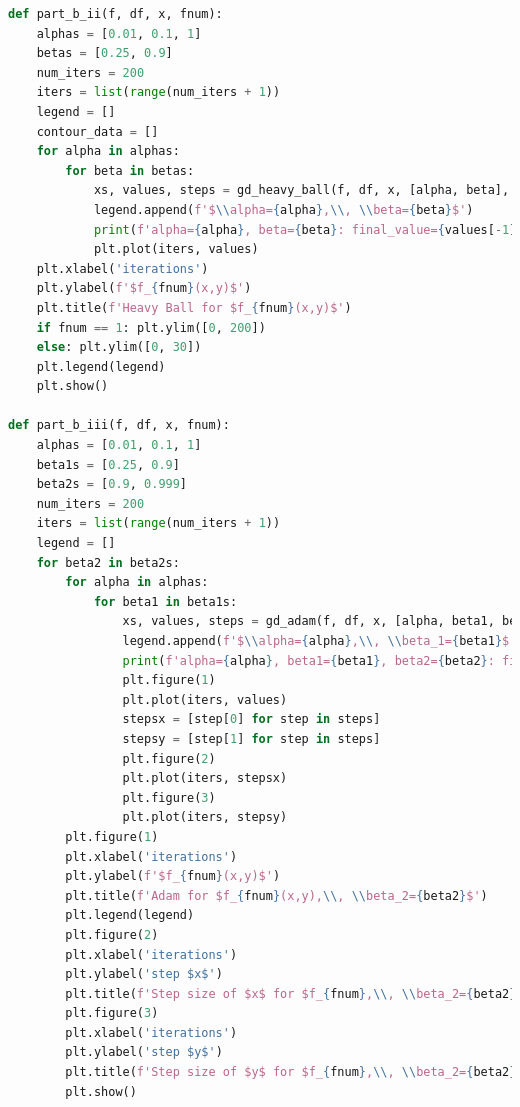 \documentclass[12pt]{article}
\begin{document}
\begin{lstlisting}[language=Python]
def part_b_ii(f, df, x, fnum):
    alphas = [0.01, 0.1, 1]
    betas = [0.25, 0.9]
    num_iters = 200
    iters = list(range(num_iters + 1))
    legend = []
    contour_data = []
    for alpha in alphas:
        for beta in betas:
            xs, values, steps = gd_heavy_ball(f, df, x, [alpha, beta], num_iters=num_iters)
            legend.append(f'$\\alpha={alpha},\\, \\beta={beta}$')
            print(f'alpha={alpha}, beta={beta}: final_value={values[-1]}')
            plt.plot(iters, values)
    plt.xlabel('iterations')
    plt.ylabel(f'$f_{fnum}(x,y)$')
    plt.title(f'Heavy Ball for $f_{fnum}(x,y)$')
    if fnum == 1: plt.ylim([0, 200])
    else: plt.ylim([0, 30])
    plt.legend(legend)
    plt.show()

def part_b_iii(f, df, x, fnum):
    alphas = [0.01, 0.1, 1]
    beta1s = [0.25, 0.9]
    beta2s = [0.9, 0.999]
    num_iters = 200
    iters = list(range(num_iters + 1))
    legend = []
    for beta2 in beta2s:
        for alpha in alphas:
            for beta1 in beta1s:
                xs, values, steps = gd_adam(f, df, x, [alpha, beta1, beta2], num_iters=num_iters)
                legend.append(f'$\\alpha={alpha},\\, \\beta_1={beta1}$')
                print(f'alpha={alpha}, beta1={beta1}, beta2={beta2}: final_value={values[-1]}')
                plt.figure(1)
                plt.plot(iters, values)
                stepsx = [step[0] for step in steps]
                stepsy = [step[1] for step in steps]
                plt.figure(2)
                plt.plot(iters, stepsx)
                plt.figure(3)
                plt.plot(iters, stepsy)
        plt.figure(1)
        plt.xlabel('iterations')
        plt.ylabel(f'$f_{fnum}(x,y)$')
        plt.title(f'Adam for $f_{fnum}(x,y),\\, \\beta_2={beta2}$')
        plt.legend(legend)
        plt.figure(2)
        plt.xlabel('iterations')
        plt.ylabel('step $x$')
        plt.title(f'Step size of $x$ for $f_{fnum},\\, \\beta_2={beta2}$')
        plt.figure(3)
        plt.xlabel('iterations')
        plt.ylabel('step $y$')
        plt.title(f'Step size of $y$ for $f_{fnum},\\, \\beta_2={beta2}$')
        plt.show()


\end{lstlisting}
\end{document}
